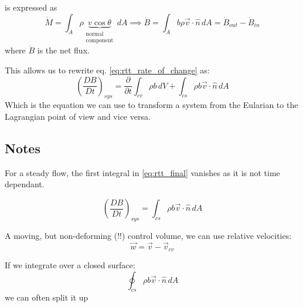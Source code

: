 \begin{figure}[H]
\begin{subfigure}[b]{0.3\linewidth}
		\caption{}
		\label{fig:rttsystemvolume}
	\end{subfigure}
	\caption{}
	\label{fig:rttsystem}
\end{figure}

is expressed as 
\begin{equation*}
	\dot M = \int_A \rho \underbrace{v\cos\theta}_{\substack{\text{normal}\\\text{component}}} \,dA\implies \dot B = \int_A b\rho \vec v \cdot \hat n \,dA = \dot B_{out} - \dot B_{in}
\end{equation*}
where $\dot B$ is the net flux.

This allows us to rewrite eq. \eqref{eq:rtt_rate_of_change} as:
\begin{equation}
	\boxed{\left(\frac{DB}{Dt}\right)_{sys} = \frac{\partial}{\partial t}\int_{cv} \rho b \,dV + \int_{cs} \rho b \vec v \cdot \hat n \,dA}
	\label{eq:rtt_final}
\end{equation}
Which is the equation we can use to transform a system from the Eularian to the Lagrangian point of view and vice versa.
\subsection{Notes}
For a steady flow, the first integral in \eqref{eq:rtt_final} vanishes as it is not time dependant.

\begin{equation*}
	\left(\frac{DB}{Dt}\right)_{sys} = \int_{cs} \rho b \vec v \cdot \hat n \,dA 
\end{equation*}


A moving, but non-deforming (!!) control volume, we can use relative velocities:
\begin{equation*}
	\vec w = \vec v - \vec v_{cv}
\end{equation*}

If we integrate over a closed surface:
\begin{equation*}
	 \oint_{cs} \rho b \vec v \cdot \hat n \,dA 
\end{equation*}
we can often split it up










